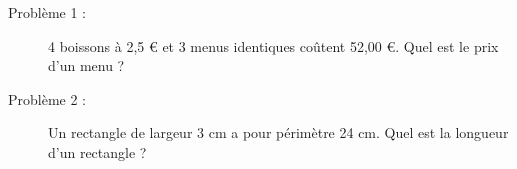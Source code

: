 
\begin{description}
\item[Problème 1 :] 4 boissons à 2,5 € et 3 menus identiques coûtent 52,00 €. Quel est le prix d'un menu ?
\item[Problème 2 :] Un rectangle de largeur 3 cm a pour périmètre 24 cm. Quel est la longueur d'un rectangle ?
\end{description}
